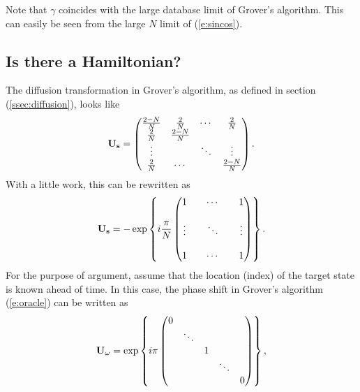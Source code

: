 %
Note that $\gamma$ coincides with the large database
limit of Grover's algorithm.  This can easily be seen from
the large $N$ limit of (\ref{e:sincos}).

\subsection{Is there a Hamiltonian?}

The diffusion transformation in Grover's algorithm,
as defined in section (\ref{ssec:diffusion}), looks like
\begin{equation}
{\bf U_s} =
\begin{pmatrix}
    \frac{2-N}{N} & \frac{2}{N} & \cdots & \frac{2}{N} \\
    \frac{2}{N}   & \frac{2-N}{N} & &  \\
    \vdots &  & \ddots & \vdots \\
    \frac{2}{N}   & \cdots && \frac{2-N}{N} 
\end{pmatrix}.
\end{equation}
With a little work, this can be rewritten as
\begin{equation}
{\bf U_s} =
- \exp \left\lbrace  i\frac{\pi}{N}
                \begin{pmatrix}
                    1      &        & \cdots &      & 1 \\
                    \\
                    \vdots &        & \ddots &      & \vdots \\
                    \\
                    1      &        & \cdots &      & 1
                \end{pmatrix}
\right\rbrace.
\end{equation}
For the purpose of argument, assume that the location (index) of
the target state is known ahead of time.  In this case, the
phase shift in Grover's algorithm (\ref{e:oracle}) can be written as
\begin{equation}
{\bf U_\omega} = 
\exp \left\lbrace  i\pi
                \begin{pmatrix}
                    0       &        &        &        &  \\
                            & \ddots &        &        &  \\
                            &        & 1      &        &  \\
                            &        &        & \ddots &  \\
                            &        &        &        & 0
                \end{pmatrix}
\right\rbrace,
\end{equation}
